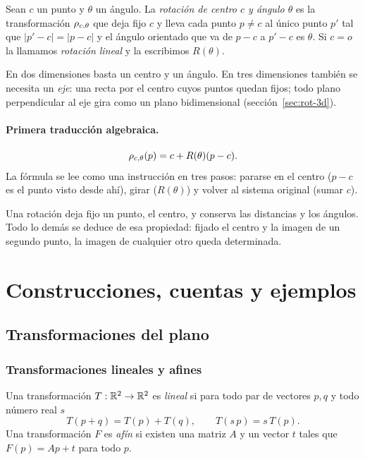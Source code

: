 \begin{definicion}
Sean \(c\) un punto y \(\theta\) un ángulo. La \emph{rotación de centro \(c\) y ángulo
\(\theta\)} es la transformación \(\rho_{c,\theta}\) que deja fijo \(c\) y lleva cada punto
\(p\neq c\) al único punto \(p'\) tal que \(|p'-c|=|p-c|\) y el ángulo orientado que va de
\(p-c\) a \(p'-c\) es \(\theta\). Si \(c=o\) la llamamos \emph{rotación lineal} y la
escribimos \(R(\theta)\).
\end{definicion}

En dos dimensiones basta un centro y un ángulo. En tres dimensiones también se necesita un
\emph{eje}: una recta por el centro cuyos puntos quedan fijos; todo plano perpendicular al eje
gira como un plano bidimensional (sección~\ref{sec:rot-3d}).

\paragraph{Primera traducción algebraica.}
\[
  \rho_{c,\theta}(p)=c+R(\theta)(p-c).
\]
La fórmula se lee como una instrucción en tres pasos: pararse en el centro (\(p-c\) es el
punto visto desde ahí), girar (\(R(\theta)\)) y volver al sistema original (sumar \(c\)).

\begin{idea}
Una rotación deja fijo un punto, el centro, y conserva las distancias y los ángulos. Todo lo
demás se deduce de esa propiedad: fijado el centro y la imagen de un segundo punto, la imagen
de cualquier otro queda determinada.
\end{idea}

\section{Construcciones, cuentas y ejemplos}

\subsection{Transformaciones del plano}\label{sec:transf-plano}

\subsubsection{Transformaciones lineales y afines}

\begin{definicion}
Una transformación \(T:\mathbb{R}^2\to\mathbb{R}^2\) es \emph{lineal} si para todo par de vectores \(p,q\) y
todo número real \(s\)
\[
  T(p+q)=T(p)+T(q),\qquad T(s\,p)=s\,T(p).
\]
Una transformación \(F\) es \emph{afín} si existen una matriz \(A\) y un vector \(t\) tales
que \(F(p)=Ap+t\) para todo \(p\).
\end{definicion}

